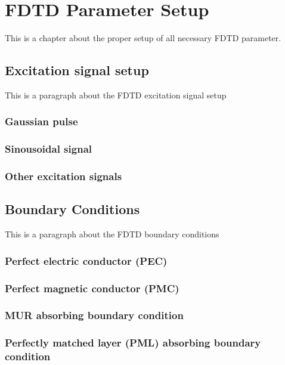 \chapter{FDTD Parameter Setup}
This is a chapter about the proper setup of all necessary FDTD parameter.

\section{Excitation signal setup}
This is a paragraph about the FDTD excitation signal setup

\subsection{Gaussian pulse}

\subsection{Sinousoidal signal}

\subsection{Other excitation signals}


\section{Boundary Conditions}
This is a paragraph about the FDTD boundary conditions

\subsection{Perfect electric conductor (PEC)}

\subsection{Perfect magnetic conductor (PMC)}

\subsection{MUR absorbing boundary condition}

\subsection{Perfectly matched layer (PML) absorbing boundary condition}
